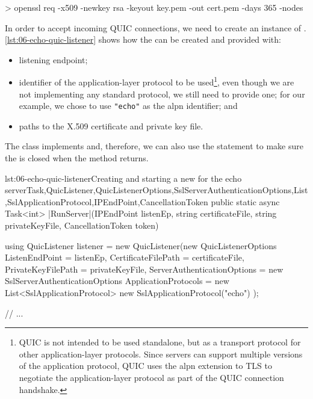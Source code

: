 \begin{myVerbatim}
> openssl req -x509 -newkey rsa -keyout key.pem -out cert.pem -days 365 -nodes
\end{myVerbatim}

In order to accept incoming QUIC connections, we need to create an instance of \QuicListener{}.
\autoref{lst:06-echo-quic-listener} shows how the \QuicListener{} can be created and provided with:

\begin{itemize}

  \item listening endpoint;

  \item identifier of the application-layer protocol to be used\footnote{QUIC is not intended to be
        used standalone, but as a transport protocol for other application-layer protocols. Since
        servers can support multiple versions of the application protocol, QUIC uses the \gls{alpn}
        extension to TLS to negotiate the application-layer protocol as part of the QUIC connection
        handshake.}, even though we are not implementing any standard protocol, we still need to
        provide one; for our example, we chose to use \texttt{"echo"} as the \gls{alpn} identifier;
        and

  \item paths to the X.509 certificate and private key file.

\end{itemize}

The \QuicListener{} class implements  and, therefore, we can also use the
 statement to make sure the \QuicListener{} is closed when the method returns.

\begin{myListingCsharp}{lst:06-echo-quic-listener}{Creating and starting a new \QuicListener{} for the echo server}{Task,QuicListener,QuicListenerOptions,SslServerAuthenticationOptions,List,SslApplicationProtocol,IPEndPoint,CancellationToken}{}
public static async Task<int> |RunServer|(IPEndPoint listenEp,
    string certificateFile, string privateKeyFile, CancellationToken token)
{
    using QuicListener listener = new QuicListener(new QuicListenerOptions
    {
        ListenEndPoint = listenEp,
        CertificateFilePath = certificateFile,
        PrivateKeyFilePath = privateKeyFile,
        ServerAuthenticationOptions = new SslServerAuthenticationOptions
        {
            ApplicationProtocols = new List<SslApplicationProtocol>
            {
                new SslApplicationProtocol("echo")
            }
        }
    });

    // ...
}
\end{myListingCsharp}

